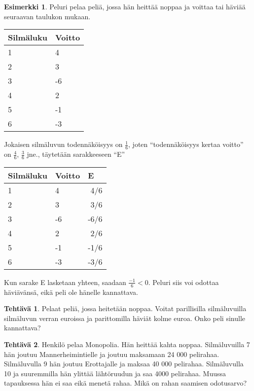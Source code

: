 \documentclass[12pt,leqno,a4paper,oneside]{amsart}
\theoremstyle{definition}
\newtheorem{example}[proclaim]{Esimerkki}
\newtheorem{exercise}{Tehtävä}
\theoremstyle{remark}
\numberwithin{equation}{section}
\begin{document}
\begin{example}
 Peluri pelaa peliä, jossa hän heittää noppaa ja voittaa tai häviää seuraavan taulukon mukaan.
 
 \begin{tabular}{l|l}
  Silmäluku & Voitto\\
  \hline
  1 & 4\\
  2 & 3\\
  3 & -6\\
  4 & 2\\
  5 & -1\\
  6 & -3\\
 \end{tabular}

 Jokaisen silmäluvun todennäköisyys on $\frac{1}{6}$, joten 
 ``todennäköisyys kertaa voitto'' on $\frac{4}{6}$, $\frac{3}{6}$ jne., täytetään sarakkeeseen ``E''
 
 \begin{tabular}{l|l|l}
  Silmäluku & Voitto &E\\
  \hline
  1 & 4 &\,\,4/6\\
  2 & 3 &\,\,3/6\\
  3 & -6 & -6/6\\
  4 & 2 &\,\,2/6\\
  5 & -1 &-1/6\\
  6 & -3 &-3/6\\
 \end{tabular}
 
 Kun sarake E lasketaan yhteen, saadaan $\frac{-1}{6} < 0.$ Peluri siis voi odottaa häviävänsä, eikä peli ole hänelle kannattava. 
\end{example}


\begin{exercise}
 Pelaat peliä, jossa heitetään noppaa. Voitat parillisilla silmäluvuilla silmäluvun verran euroissa ja parittomilla häviät 
 kolme euroa. Onko peli sinulle kannattava?
\end{exercise}



\begin{exercise}
 Henkilö pelaa Monopolia. Hän heittää kahta noppaa. Silmäluvuilla 7 hän joutuu Mannerheimintielle ja joutuu maksamaan 24 000 pelirahaa. Silmäluvulla
 9 hän joutuu Erottajalle ja maksaa 40 000 pelirahaa. Silmäluvulla 10 ja suuremmilla hän ylittää lähtöruudun ja saa 4000 pelirahaa. Muussa tapauksessa
 hän ei saa eikä menetä rahaa. Mikä on rahan saamisen
 odotusarvo?
 
\end{exercise}
\end{document}
